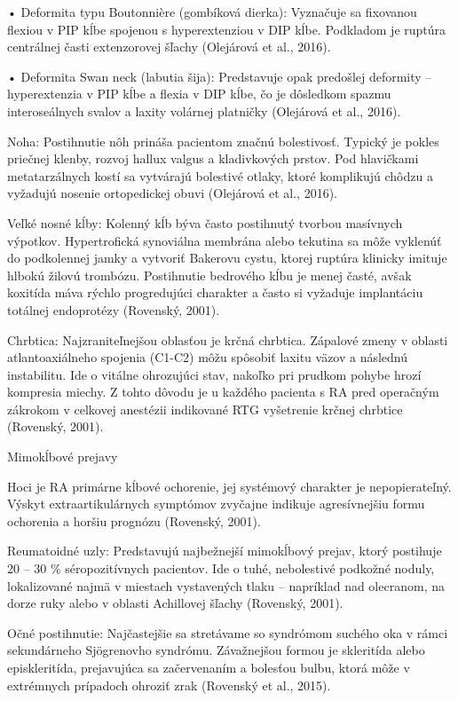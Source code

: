 • Deformita typu Boutonnière (gombíková dierka): Vyznačuje sa fixovanou flexiou v PIP kĺbe spojenou s hyperextenziou v DIP kĺbe. Podkladom je ruptúra centrálnej časti extenzorovej šľachy (Olejárová et al., 2016). 

• Deformita Swan neck (labutia šija): Predstavuje opak predošlej deformity – hyperextenzia v PIP kĺbe a flexia v DIP kĺbe, čo je dôsledkom spazmu interoseálnych svalov a laxity volárnej platničky (Olejárová et al., 2016). 

Noha: Postihnutie nôh prináša pacientom značnú bolestivosť. Typický je pokles priečnej klenby, rozvoj hallux valgus a kladivkových prstov. Pod hlavičkami metatarzálnych kostí sa vytvárajú bolestivé otlaky, ktoré komplikujú chôdzu a vyžadujú nosenie ortopedickej obuvi (Olejárová et al., 2016). 

Veľké nosné kĺby: Kolenný kĺb býva často postihnutý tvorbou masívnych výpotkov. Hypertrofická synoviálna membrána alebo tekutina sa môže vyklenúť do podkolennej jamky a vytvoriť Bakerovu cystu, ktorej ruptúra klinicky imituje hlbokú žilovú trombózu. Postihnutie bedrového kĺbu je menej časté, avšak koxitída máva rýchlo progredujúci charakter a často si vyžaduje implantáciu totálnej endoprotézy (Rovenský, 2001). 

Chrbtica: Najzraniteľnejšou oblasťou je krčná chrbtica. Zápalové zmeny v oblasti atlantoaxiálneho spojenia (C1-C2) môžu spôsobiť laxitu väzov a následnú instabilitu. Ide o vitálne ohrozujúci stav, nakoľko pri prudkom pohybe hrozí kompresia miechy. Z tohto dôvodu je u každého pacienta s RA pred operačným zákrokom v celkovej anestézii indikované RTG vyšetrenie krčnej chrbtice (Rovenský, 2001). 
 

\vspace{0.5em}
Mimokĺbové prejavy

Hoci je RA primárne kĺbové ochorenie, jej systémový charakter je nepopierateľný. Výskyt extraartikulárnych symptómov zvyčajne indikuje agresívnejšiu formu ochorenia a horšiu prognózu (Rovenský, 2001). 

Reumatoidné uzly: Predstavujú najbežnejší mimokĺbový prejav, ktorý postihuje 20 – 30 \% séropozitívnych pacientov. Ide o tuhé, nebolestivé podkožné noduly, lokalizované najmä v miestach vystavených tlaku – napríklad nad olecranom, na dorze ruky alebo v oblasti Achillovej šľachy (Rovenský, 2001). 

Očné postihnutie: Najčastejšie sa stretávame so syndrómom suchého oka v rámci sekundárneho Sjögrenovho syndrómu. Závažnejšou formou je skleritída alebo episkleritída, prejavujúca sa začervenaním a bolesťou bulbu, ktorá môže v extrémnych prípadoch ohroziť zrak (Rovenský et al., 2015). 


